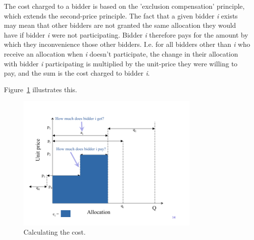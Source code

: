 The cost charged to a bidder is based on the 'exclusion compensation' principle, which extends the second-price principle. The fact that a given bidder {\it i} exists may mean that other bidders are not granted the same allocation they would have if bidder {\it i} were not participating. Bidder {\it i} therefore pays for the amount by which they inconvenience those other bidders. I.e. for all bidders other than {\it i} who receive an allocation when {\it i} doesn't participate, the change in their allocation with bidder {\it i} participating is multiplied by the unit-price they were willing to pay, and the sum is the cost charged to bidder {\it i}.

Figure~\ref{fig:cost} illustrates this.

\begin{figure}[h]
 \centering
   \includegraphics[width=0.8\textwidth]{cost}
       \caption{Calculating the cost.}
 \label{fig:cost}
\end{figure}
